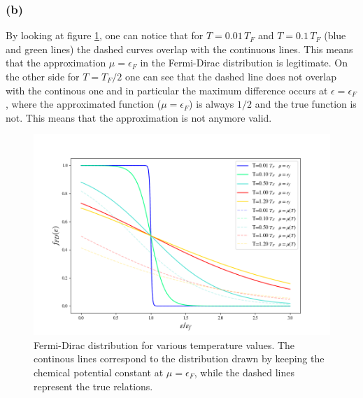 \documentclass{article}
\begin{document}
\subsubsection*{(b)}
By looking at figure \ref{fig:fFD_mu}, one can notice that for $T=0.01 \, T_F$ and $T=0.1 \, T_F$ (blue and green lines) the dashed curves overlap with the continuous lines. This means that the approximation 
$\mu = \epsilon_F$ in the Fermi-Dirac distribution is legitimate. On the other side for $T=T_F/2$ one can see that the dashed line does not overlap with the continous one and in particular the maximum difference 
occurs at $\epsilon = \epsilon_F$, where the approximated function ($\mu = \epsilon_F$) is always $1/2$ and the true function is not. This means that the approximation is not anymore valid.
\begin{figure}[htp]
    \centering 
    \includegraphics[scale=0.5]{scripts/f_fd_mu.png}
    \caption{Fermi-Dirac distribution for various temperature values. The continous lines correspond to 
    the distribution drawn by keeping the chemical potential constant at $\mu=\epsilon_F$, while the dashed lines represent the true relations.}
    \label{fig:fFD_mu}
\end{figure}
\end{document}
